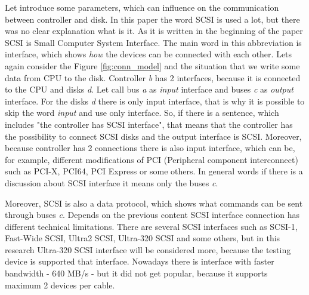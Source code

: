 Let introduce some parameters, which can influence on the communication between controller and disk. 
In this paper the word SCSI is used a lot, but there was no clear explanation what is it. As it is written in the beginning of the paper SCSI is Small Computer System Interface. The main word in this abbreviation is interface, which shows \emph{how} the devices can be connected with each other. Lets again consider the Figure \ref{fig:conn_model} and the situation that we write some data from CPU to the disk. Controller \emph{b} has 2 interfaces, because it is connected to the CPU and disks \emph{d}. Let call bus \emph{a} as \emph{input} interface and buses \emph{c} as \emph{output} interface. For the disks \emph{d} there is only input interface, that is why it is possible to skip the word \emph{input} and use only interface. So, if there is a sentence, which includes "the controller has SCSI interface", that means that the controller has the possibility to connect SCSI disks and the output interface is SCSI. Moreover, because controller has 2 connections there is also input interface, which can be, for example, different modifications of PCI (Peripheral component interconnect) such as PCI-X, PCI64, PCI Express or some others. In general words if there is a discussion about SCSI interface it means only the buses \emph{c}.

Moreover, SCSI is also a data protocol, which shows what commands can be sent through buses \emph{c}. Depends on the previous content SCSI interface connection has different technical limitations. There are several SCSI interfaces such as SCSI-1, Fast-Wide SCSI, Ultra2 SCSI, Ultra-320 SCSI and some others, but in this research Ultra-320 SCSI interface will be considered more, because the testing device is supported that interface. Nowadays there is interface with faster bandwidth - 640 MB/s - but it did not get popular, because it supports maximum 2 devices per cable.

